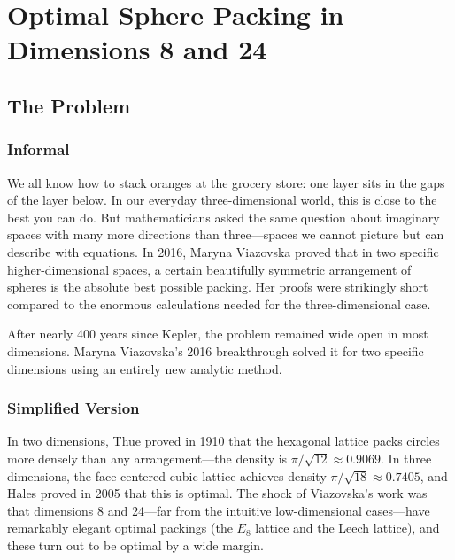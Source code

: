 \let\LocalMacro\relax

\chapter{Optimal Sphere Packing in Dimensions 8 and 24}

\section{The Problem}

\subsection{Informal}
We all know how to stack oranges at the grocery store: one layer sits in the gaps of the layer below. In our everyday three-dimensional world, this is close to the best you can do. But mathematicians asked the same question about imaginary spaces with many more directions than three---spaces we cannot picture but can describe with equations. In 2016, Maryna Viazovska proved that in two specific higher-dimensional spaces, a certain beautifully symmetric arrangement of spheres is the absolute best possible packing. Her proofs were strikingly short compared to the enormous calculations needed for the three-dimensional case.

\begin{historicalbox}
After nearly 400 years since Kepler, the problem remained wide open in most dimensions. Maryna Viazovska's 2016 breakthrough solved it for two specific dimensions using an entirely new analytic method.
\end{historicalbox}

\subsection{Simplified Version}
In two dimensions, Thue proved in 1910 that the hexagonal lattice packs circles more densely than any arrangement---the density is $\pi/\sqrt{12} \approx 0.9069$. In three dimensions, the face-centered cubic lattice achieves density $\pi/\sqrt{18} \approx 0.7405$, and Hales proved in 2005 that this is optimal. The shock of Viazovska's work was that dimensions 8 and 24---far from the intuitive low-dimensional cases---have remarkably elegant optimal packings (the $E_8$ lattice and the Leech lattice), and these turn out to be optimal by a wide margin.

